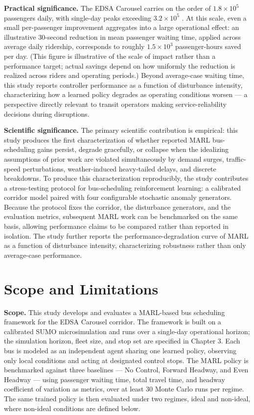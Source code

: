 \textbf{Practical significance.} The EDSA Carousel carries on the order of $1.8\times10^5$ passengers daily, with single-day peaks exceeding $3.2\times10^5$ \cite{DOTr2025Ridership}. At this scale, even a small per-passenger improvement aggregates into a large operational effect: an illustrative 30-second reduction in mean passenger waiting time, applied across average daily ridership, corresponds to roughly $1.5\times10^3$ passenger-hours saved per day. (This figure is illustrative of the scale of impact rather than a performance target; actual savings depend on how uniformly the reduction is realized across riders and operating periods.) Beyond average-case waiting time, this study reports controller performance as a function of disturbance intensity, characterizing how a learned policy degrades as operating conditions worsen --- a perspective directly relevant to transit operators making service-reliability decisions during disruptions.

\textbf{Scientific significance.} The primary scientific contribution is empirical: this study produces the first characterization of whether reported MARL bus-scheduling gains persist, degrade gracefully, or collapse when the idealizing assumptions of prior work are violated simultaneously by demand surges, traffic-speed perturbations, weather-induced heavy-tailed delays, and discrete breakdowns. To produce this characterization reproducibly, the study contributes a stress-testing protocol for bus-scheduling reinforcement learning: a calibrated corridor model paired with four configurable stochastic anomaly generators. Because the protocol fixes the corridor, the disturbance generators, and the evaluation metrics, subsequent MARL work can be benchmarked on the same basis, allowing performance claims to be compared rather than reported in isolation. The study further reports the performance-degradation curve of MARL as a function of disturbance intensity, characterizing robustness rather than only average-case performance.

\section{Scope and Limitations}
 
\textbf{Scope.} This study develops and evaluates a MARL-based bus scheduling framework for the EDSA Carousel corridor. The framework is built on a calibrated SUMO microsimulation and runs over a single-day operational horizon; the simulation horizon, fleet size, and stop set are specified in Chapter 3. Each bus is modeled as an independent agent sharing one learned policy, observing only local conditions and acting at designated control stops. The MARL policy is benchmarked against three baselines — No Control, Forward Headway, and Even Headway — using passenger waiting time, total travel time, and headway coefficient of variation as metrics, over at least 30 Monte Carlo runs per regime. The same trained policy is then evaluated under two regimes, ideal and non-ideal, where non-ideal conditions are defined below.
 
